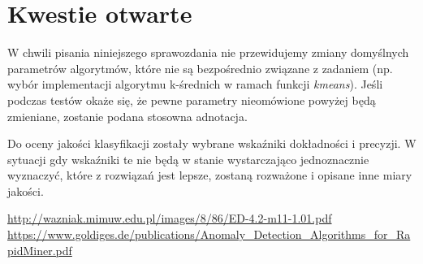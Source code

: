 \documentclass[11pt,a4paper,twoside]{article}
\begin{document}
\section{Kwestie otwarte}
W chwili pisania niniejszego sprawozdania nie przewidujemy zmiany domyślnych parametrów algorytmów, które nie są bezpośrednio związane z zadaniem (np. wybór implementacji algorytmu k-średnich w ramach funkcji \textit{kmeans}). Jeśli podczas testów okaże się, że pewne parametry nieomówione powyżej będą zmieniane, zostanie podana stosowna adnotacja.

Do oceny jakości klasyfikacji zostały wybrane wskaźniki dokładności i precyzji. W sytuacji gdy wskaźniki te nie będą w stanie wystarczająco jednoznacznie wyznaczyć, które z rozwiązań jest lepsze, zostaną rozważone i opisane inne miary jakości.

\begin{thebibliography}{9}
\url{http://wazniak.mimuw.edu.pl/images/8/86/ED-4.2-m11-1.01.pdf}
\url{https://www.goldiges.de/publications/Anomaly_Detection_Algorithms_for_RapidMiner.pdf}


\end{thebibliography}
\end{document}
